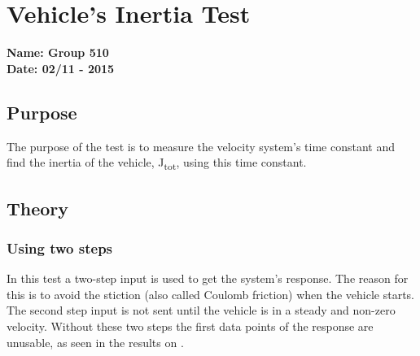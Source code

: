 \pagebreak
\section{Vehicle's Inertia Test} \label{app:inertiaTest}
\textbf{Name: Group 510}\\
\textbf{Date: 02/11 - 2015}

\subsection{Purpose}
The purpose of the test is to measure the velocity system's time constant and find the inertia of the vehicle, \si{J_{tot}}, using this time constant.
\subsection{Theory}



\subsubsection{Using two steps}
In this test a two-step input is used to get the system's response. The reason for this is to avoid the stiction (also called Coulomb friction) when the vehicle starts. The second step input is not sent until the vehicle is in a steady and non-zero velocity. Without these two steps the first data points of the response are unusable, as seen in the results on .

